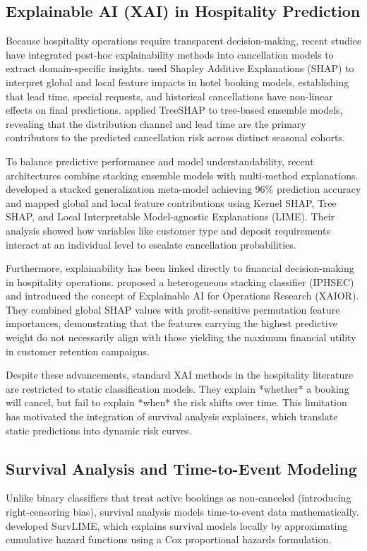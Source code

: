 \documentclass[pdflatex,sn-mathphys-ay]{sn-jnl}%
\theoremstyle{thmstyleone}%
\theoremstyle{thmstyletwo}%
\theoremstyle{thmstylethree}%
\begin{document}
\subsection{Explainable AI (XAI) in Hospitality Prediction}
Because hospitality operations require transparent decision-making, recent studies have integrated post-hoc explainability methods into cancellation models to extract domain-specific insights. \cite{gomez2025machine} used Shapley Additive Explanations (SHAP) to interpret global and local feature impacts in hotel booking models, establishing that lead time, special requests, and historical cancellations have non-linear effects on final predictions. \cite{herrera2024machine} applied TreeSHAP to tree-based ensemble models, revealing that the distribution channel and lead time are the primary contributors to the predicted cancellation risk across distinct seasonal cohorts.

To balance predictive performance and model understandability, recent architectures combine stacking ensemble models with multi-method explanations. \cite{talal2025hotel} developed a stacked generalization meta-model achieving 96\% prediction accuracy and mapped global and local feature contributions using Kernel SHAP, Tree SHAP, and Local Interpretable Model-agnostic Explanations (LIME). Their analysis showed how variables like customer type and deposit requirements interact at an individual level to escalate cancellation probabilities. 

Furthermore, explainability has been linked directly to financial decision-making in hospitality operations. \cite{liu2025explainable} proposed a heterogeneous stacking classifier (IPHSEC) and introduced the concept of Explainable AI for Operations Research (XAIOR). They combined global SHAP values with profit-sensitive permutation feature importances, demonstrating that the features carrying the highest predictive weight do not necessarily align with those yielding the maximum financial utility in customer retention campaigns. 

Despite these advancements, standard XAI methods in the hospitality literature are restricted to static classification models. They explain *whether* a booking will cancel, but fail to explain *when* the risk shifts over time. This limitation has motivated the integration of survival analysis explainers, which translate static predictions into dynamic risk curves.

\subsection{Survival Analysis and Time-to-Event Modeling}
Unlike binary classifiers that treat active bookings as non-canceled (introducing right-censoring bias), survival analysis models time-to-event data mathematically. \cite{kovalev2020survlime} developed SurvLIME, which explains survival models locally by approximating cumulative hazard functions using a Cox proportional hazards formulation. 
\end{document}
